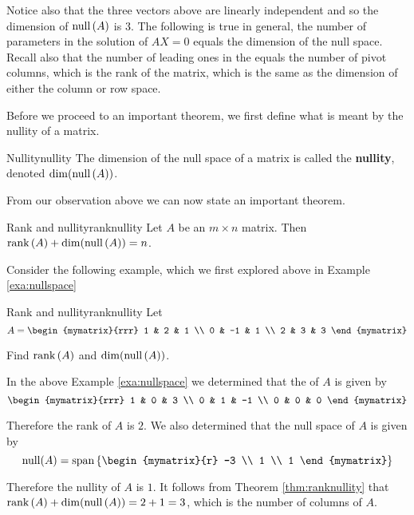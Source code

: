 Notice also that the three vectors above are linearly independent and
so the dimension of $\mbox{null} \left( A\right) $ is 3. The following is
true in general, the number of parameters in the solution of $AX=0$
equals the dimension of the null space. Recall also that the number of
leading ones in the {\rref} equals the number of pivot columns, which is
the rank of the matrix, which is the same as the dimension of either
the column or row space.

Before we proceed to an important theorem, we first define what is meant by the nullity of a matrix. 

\begin{definition}{Nullity}{nullity}
The dimension of the null space of a matrix is called the \textbf{nullity}, denoted $\dim( \mbox{null}\left(A\right))$.
\end{definition}

From our observation above we can now state an important theorem.

\begin{theorem}{Rank and nullity}{ranknullity}
Let $A$ be an $m\times n$ matrix. Then $\mbox{rank}\left( A\right) + \dim( \mbox{null}\left(A\right)) =n$. 
\end{theorem}

Consider the following example, which we first explored above in Example \ref{exa:nullspace}

\begin{example}{Rank and nullity}{ranknullity}
Let
\begin{equation*}
A=\begin{mymatrix}{rrr}
1 & 2 & 1 \\
0 & -1 & 1 \\
2 & 3 & 3
\end{mymatrix} 
\end{equation*}

Find $\mbox{rank}\left( A\right)$ and $\dim( \mbox{null}\left(A\right))$. 
\end{example}

\medskip
\begin{solution}
In the above Example \ref{exa:nullspace} we determined that the {\rref} of $A$ is given by 
\[
\begin{mymatrix}{rrr}
1 & 0 & 3 \\ 
0 & 1 & -1  \\
0 & 0 & 0 
\end{mymatrix}
\]

Therefore the rank of $A$ is $2$. We also determined that the null space of $A$ is given by 
\[
\func{null} (A) = \func{span} \left\{ \begin{mymatrix}{r}
-3 \\ 
1 \\ 
1
\end{mymatrix}
\right\}
\]

Therefore the nullity of $A$ is $1$. It follows from Theorem \ref{thm:ranknullity} that $\mbox{rank}\left( A\right) + \dim( \mbox{null}\left(A\right)) = 2 + 1 = 3$, which is the number of columns of $A$.
\end{solution} 

